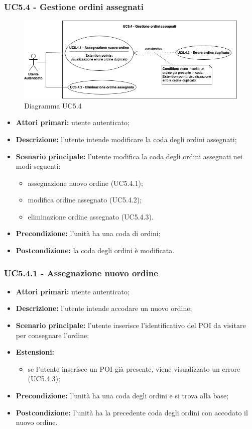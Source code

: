 \subsubsection{UC5.4 - Gestione ordini assegnati}
\begin{figure}[h!]
    \centering
    \includegraphics[width=18cm]{images/uc5.4.png}
    \caption{Diagramma UC5.4}
\end{figure}
\begin{itemize}
    \item \textbf{Attori primari:} utente autenticato;
    \item \textbf{Descrizione:} l'utente intende modificare la coda degli ordini assegnati;
    \item \textbf{Scenario principale:} l'utente modifica la coda degli ordini assegnati nei modi seguenti:
    \begin{itemize}
        \item assegnazione nuovo ordine (UC5.4.1);
        \item modifica ordine assegnato (UC5.4.2);
        \item eliminazione ordine assegnato (UC5.4.3).
    \end{itemize}
    \item \textbf{Precondizione:} l'unità ha una coda di ordini;
    \item \textbf{Postcondizione:} la coda degli ordini è modificata.
\end{itemize}

\subsubsection{UC5.4.1 - Assegnazione nuovo ordine}
\begin{itemize}
    \item \textbf{Attori primari:} utente autenticato;
    \item \textbf{Descrizione:} l'utente intende accodare un nuovo ordine;
    \item \textbf{Scenario principale:} l'utente inserisce l'identificativo del POI da visitare per consegnare l'ordine;
    \item \textbf{Estensioni:}
    \begin{itemize}
        \item se l'utente inserisce un POI già presente, viene visualizzato un errore (UC5.4.3);
    \end{itemize}
    \item \textbf{Precondizione:} l'unità ha una coda degli ordini e si trova alla base;
    \item \textbf{Postcondizione:} l'unità ha la precedente coda degli ordini con accodato il nuovo ordine.
\end{itemize}

